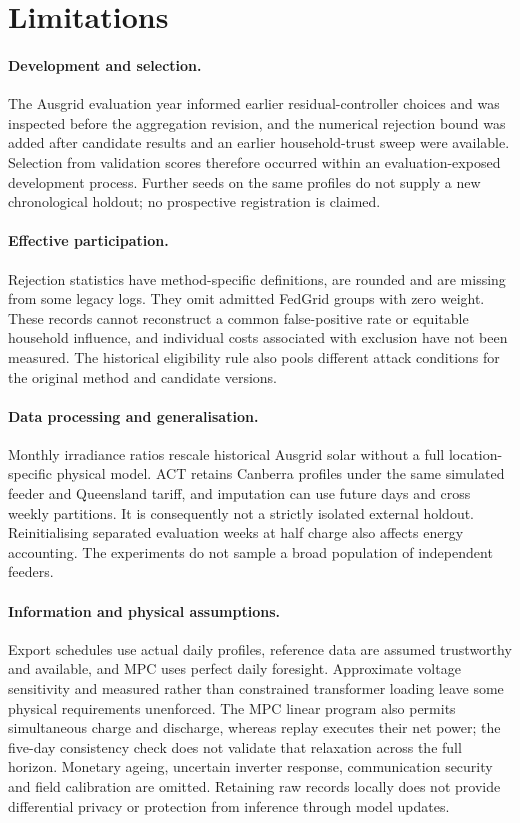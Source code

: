 \section{Limitations}
\label{sec:limitations}
\paragraph{Development and selection.}
The Ausgrid evaluation year informed earlier residual-controller choices and was inspected before the aggregation revision, and the numerical rejection bound was added after candidate results and an earlier household-trust sweep were available. Selection from validation scores therefore occurred within an evaluation-exposed development process. Further seeds on the same profiles do not supply a new chronological holdout; no prospective registration is claimed.

\paragraph{Effective participation.}
Rejection statistics have method-specific definitions, are rounded and are missing from some legacy logs. They omit admitted FedGrid groups with zero weight. These records cannot reconstruct a common false-positive rate or equitable household influence, and individual costs associated with exclusion have not been measured. The historical eligibility rule also pools different attack conditions for the original method and candidate versions.

\paragraph{Data processing and generalisation.}
Monthly irradiance ratios rescale historical Ausgrid solar without a full location-specific physical model. ACT retains Canberra profiles under the same simulated feeder and Queensland tariff, and imputation can use future days and cross weekly partitions. It is consequently not a strictly isolated external holdout. Reinitialising separated evaluation weeks at half charge also affects energy accounting. The experiments do not sample a broad population of independent feeders.

\paragraph{Information and physical assumptions.}
Export schedules use actual daily profiles, reference data are assumed trustworthy and available, and MPC uses perfect daily foresight. Approximate voltage sensitivity and measured rather than constrained transformer loading leave some physical requirements unenforced. The MPC linear program also permits simultaneous charge and discharge, whereas replay executes their net power; the five-day consistency check does not validate that relaxation across the full horizon. Monetary ageing, uncertain inverter response, communication security and field calibration are omitted. Retaining raw records locally does not provide differential privacy or protection from inference through model updates.

